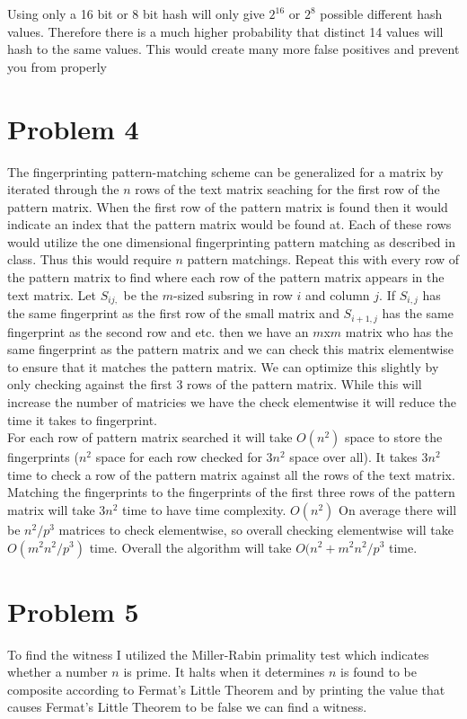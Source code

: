 \documentclass[11pt]{article}
\begin{document}
Using only a 16 bit or 8 bit hash will only give $2^{16}$ or $2^8$ possible different hash values. Therefore there is a much higher probability that distinct 14 values will hash to the same values. This would create many more false positives and prevent you from properly 

\section*{Problem 4}
The fingerprinting pattern-matching scheme can be generalized for a matrix by iterated through the $n$ rows of the text matrix seaching for the first row of the pattern matrix. When the first row of the pattern matrix is found then it would indicate an index that the pattern matrix would be found at.  Each of these rows would utilize the one dimensional fingerprinting pattern matching as described in class. Thus this would require $n$ pattern matchings. Repeat this with every row of the pattern matrix to find where each row of the pattern matrix appears in the text matrix. Let $S_{ij,}$ be the $m$-sized subsring in row $i$ and column $j$. If $S_{i,j}$ has the same fingerprint as the first row of the small matrix and $S_{i+1,j}$ has the same fingerprint as the second row and etc. then we have an $m$x$m$ matrix who has the same fingerprint as the pattern matrix and we can check this matrix elementwise to ensure that it matches the pattern matrix. We can optimize this slightly by only checking against the first 3 rows of the pattern matrix. While this will increase the number of matricies we have the check elementwise it will reduce the time it takes to fingerprint. \\

For each row of pattern matrix searched it will take $O(n^2)$ space to store the fingerprints ($n^2$ space for each row checked for $3n^2$ space over all). It takes $3n^2$ time to check a row of the pattern matrix against all the rows of the text matrix. Matching the fingerprints to the fingerprints of the first three rows of the pattern matrix will take $3n^2$ time to have time complexity.  $O(n^2)$ On average there will be $n^2/p^3$ matrices to check elementwise, so overall checking elementwise will take $O(m^2n^2/p^3)$ time. Overall the algorithm will take $O(n^2+m^2n^2/p^3$ time.

\section*{Problem 5}
To find the witness I utilized the Miller-Rabin primality test which indicates whether a number $n$ is prime. It halts when it determines $n$ is found to be composite according to Fermat's Little Theorem and by printing the value that causes Fermat's Little Theorem to be false we can find a witness. 
\end{document}
